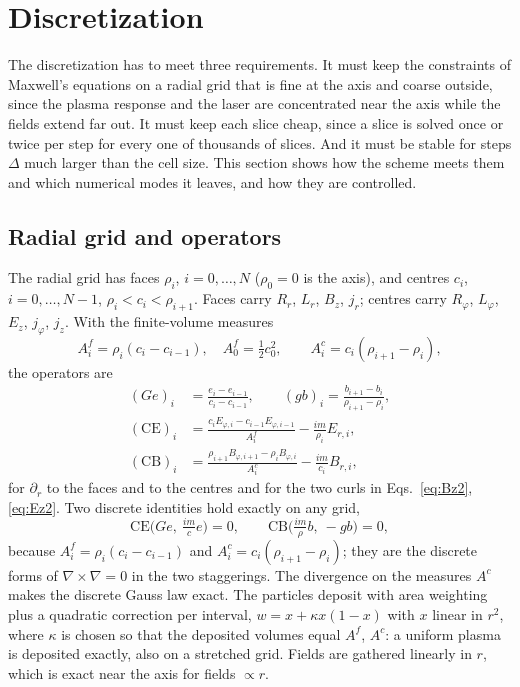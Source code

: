 \documentclass[aps,prab,reprint,floatfix,superscriptaddress,amsmath,amssymb]{revtex4-2}
\begin{document}
\section{Discretization}\label{sec:disc}

The discretization has to meet three requirements. It must keep the constraints of Maxwell's equations on a radial grid that is fine at the axis and coarse outside, since the plasma response and the laser are concentrated near the axis while the fields extend far out. It must keep each slice cheap, since a slice is solved once or twice per step for every one of thousands of slices. And it must be stable for steps $\Delta$ much larger than the cell size. This section shows how the scheme meets them and which numerical modes it leaves, and how they are controlled.

\subsection{Radial grid and operators}

The radial grid has faces $\rho_i$, $i = 0,\dots,N$ ($\rho_0 = 0$ is the axis), and centres $c_i$, $i = 0,\dots,N-1$, $\rho_i < c_i < \rho_{i+1}$. Faces carry $R_r$, $L_r$, $B_z$, $j_r$; centres carry $R_\varphi$, $L_\varphi$, $E_z$, $j_\varphi$, $j_z$. With the finite-volume measures
\begin{equation}
A^f_i = \rho_i (c_i - c_{i-1}), \quad A^f_0 = \tfrac12 c_0^2, \qquad A^c_i = c_i(\rho_{i+1} - \rho_i),
\end{equation}
the operators are
\begin{align}
(G e)_i &= \frac{e_i - e_{i-1}}{c_i - c_{i-1}}, \qquad
(g b)_i = \frac{b_{i+1} - b_i}{\rho_{i+1} - \rho_i}, \\
(\mathrm{CE})_i &= \frac{c_i E_{\varphi,i} - c_{i-1}E_{\varphi,i-1}}{A^f_i} - \frac{im}{\rho_i}E_{r,i}, \\
(\mathrm{CB})_i &= \frac{\rho_{i+1}B_{\varphi,i+1} - \rho_i B_{\varphi,i}}{A^c_i} - \frac{im}{c_i}B_{r,i},
\end{align}
for $\partial_r$ to the faces and to the centres and for the two curls in Eqs.~\eqref{eq:Bz2}, \eqref{eq:Ez2}. Two discrete identities hold exactly on any grid,
\begin{equation}
\mathrm{CE}\bigl(G e,\ \tfrac{im}{c} e\bigr) = 0, \qquad \mathrm{CB}\bigl(\tfrac{im}{\rho} b,\ -g b\bigr) = 0, \label{eq:curlgrad}
\end{equation}
because $A^f_i = \rho_i(c_i - c_{i-1})$ and $A^c_i = c_i(\rho_{i+1}-\rho_i)$; they are the discrete forms of $\nabla\times\nabla = 0$ in the two staggerings. The divergence on the measures $A^c$ makes the discrete Gauss law exact. The particles deposit with area weighting plus a quadratic correction per interval, $w = x + \kappa x(1-x)$ with $x$ linear in $r^2$, where $\kappa$ is chosen so that the deposited volumes equal $A^f$, $A^c$: a uniform plasma is deposited exactly, also on a stretched grid. Fields are gathered linearly in $r$, which is exact near the axis for fields $\propto r$.
\end{document}
